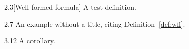 \documentclass[a4paper, 11pt]{article}
\theoremstyle{definition}
\begin{document}
\begin{definition}{2.3}[Well-formed formula]\label{def:wff}
A test definition.
\end{definition}

\begin{example}{2.7}
An example without a title, citing Definition~\ref{def:wff}.
\end{example}

\begin{corollary}{3.12}
A corollary.
\end{corollary}
\end{document}
